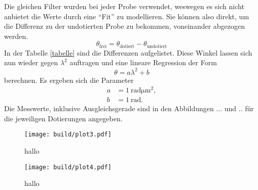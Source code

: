 Die gleichen Filter wurden bei jeder Probe verwendet, weswegen es sich nicht anbietet die Werte durch eine \enquote{Fit} zu modellieren.
Sie können also direkt, um die Differenz zu der undotierten Probe zu bekommen, voneinander abgezogen werden.
\begin{equation}
\theta_{\text{frei}} = \theta_{\text{dotiert}} - \theta_{\text{undotiert}}
\end{equation}
In der Tabelle \ref{tabelle} sind die Differenzen aufgelistet. Diese Winkel lassen sich nun wieder gegen $\lambda^2$ auftragen und eine lineare Regression
der Form
\begin{equation}
\theta = a \lambda^2 + b
\end{equation}
berechnen.
Es ergeben sich die Parameter 
\begin{align*}
a &= \SI{1}{\radian\micro\meter\squared},\\
b &= \SI{1}{\radian}.
\end{align*}
Die Messwerte, inklusive Ausgleichsgerade sind in den Abbildungen ... und .. für die jeweiligen Dotierungen angegeben.

\begin{figure}
    \centering
    \texttt{[image: build/plot3.pdf]}
    \caption{hallo}
\end{figure}

\begin{figure}
    \centering
    \texttt{[image: build/plot4.pdf]}
    \caption{hallo}
\end{figure}